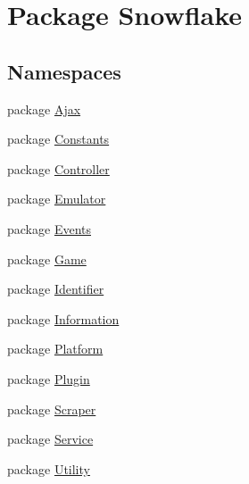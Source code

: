 \hypertarget{namespace_snowflake}{}\section{Package Snowflake}
\label{namespace_snowflake}
\subsection*{Namespaces}
\begin{DoxyCompactItemize}
\item 
package \hyperlink{namespace_snowflake_1_1_ajax}{Ajax}
\item 
package \hyperlink{namespace_snowflake_1_1_constants}{Constants}
\item 
package \hyperlink{namespace_snowflake_1_1_controller}{Controller}
\item 
package \hyperlink{namespace_snowflake_1_1_emulator}{Emulator}
\item 
package \hyperlink{namespace_snowflake_1_1_events}{Events}
\item 
package \hyperlink{namespace_snowflake_1_1_game}{Game}
\item 
package \hyperlink{namespace_snowflake_1_1_identifier}{Identifier}
\item 
package \hyperlink{namespace_snowflake_1_1_information}{Information}
\item 
package \hyperlink{namespace_snowflake_1_1_platform}{Platform}
\item 
package \hyperlink{namespace_snowflake_1_1_plugin}{Plugin}
\item 
package \hyperlink{namespace_snowflake_1_1_scraper}{Scraper}
\item 
package \hyperlink{namespace_snowflake_1_1_service}{Service}
\item 
package \hyperlink{namespace_snowflake_1_1_utility}{Utility}
\end{DoxyCompactItemize}
